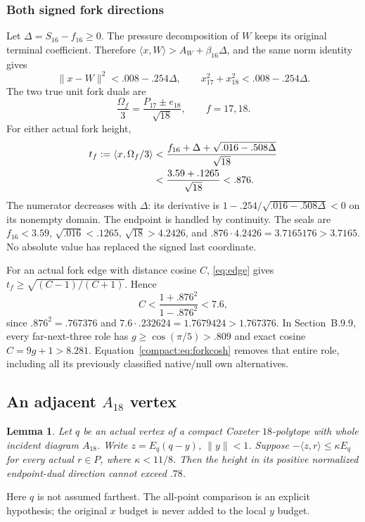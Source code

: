 \documentclass[11pt]{article}
\newtheorem{lemma}[theorem]{Lemma}
\theoremstyle{remark}\newtheorem{remark}[theorem]{Remark}
\numberwithin{equation}{section}
\newcommand{\ip}[2]{\langle #1,#2\rangle}
\newcommand{\norm}[1]{\lVert #1\rVert}
\begin{document}
\subsubsection{Both signed fork directions}
\label{compact:subsec:forkheight}
Let \(\Delta=S_{16}-f_{16}\geq0\). The pressure decomposition
of \(W\) keeps its original terminal coefficient. Therefore
 \(\ip{x}{W}>A_W+\beta_{16}\Delta\), and the same norm identity
gives
 \begin{equation}
\label{compact:eq:slack}
 \norm{x-W}^2<.008-.254\Delta,\qquad
 x_{17}^2+x_{18}^2<.008-.254\Delta.
\end{equation}
The two true unit fork duals are
 \[
 \frac{\Omega_f}{3}
   =\frac{P_{17}\pm e_{18}}{\sqrt{18}},
 \qquad f=17,18.
\]
For either actual fork height,
\begin{align}
\label{compact:eq:truefork}
 t_f:=\ip{x}{\Omega_f/3}
 &<\frac{f_{16}+\Delta+\sqrt{.016-.508\Delta}}{\sqrt{18}}\notag\\
 &<\frac{3.59+.1265}{\sqrt{18}}<.876.
\end{align}
The numerator decreases with \(\Delta\): its derivative is
 \(1-.254/\sqrt{.016-.508\Delta}<0\) on its nonempty domain.
The endpoint is handled by continuity. The seals are
 \(f_{16}<3.59\), \(\sqrt{.016}<.1265\),
\(\sqrt{18}>4.2426\), and
 \(.876\cdot4.2426=3.7165176>3.7165\).
No absolute value has replaced the signed last coordinate.

For an actual fork edge with distance cosine \(C\),
\eqref{eq:edge} gives
 \(t_f\geq\sqrt{(C-1)/(C+1)}\). Hence
 \begin{equation}
\label{compact:eq:forkcosh}
 C<\frac{1+.876^2}{1-.876^2}<7.6,
\end{equation}
since \(.876^2=.767376\) and
 \(7.6\cdot.232624=1.7679424>1.767376\).
In Section~B.9.9, every far-next-three
role has \(g\geq\cos(\pi/5)>.809\) and exact cosine
 \(C=9g+1>8.281\). Equation~\eqref{compact:eq:forkcosh} removes that
entire role, including all its previously classified native/null
own alternatives.


\subsection[An adjacent A18 vertex]{An adjacent $A_{18}$ vertex}
\label{compact:sec:localA18}
\begin{lemma}\label{compact:lem:localA18}
Let $q$ be an actual vertex of a compact Coxeter $18$-polytope with whole
incident diagram $A_{18}$. Write $z=E_q(q-y)$, $\norm y<1$. Suppose
$-\ip zr\le\kappa E_q$ for every actual $r\in P$, where $\kappa<11/8$.
Then the height in its positive normalized endpoint-dual direction
cannot exceed $.78$.
\end{lemma}
Here $q$ is not assumed farthest. The all-point comparison is an explicit
hypothesis; the original $x$ budget is never added to the local $y$ budget.
\end{document}
